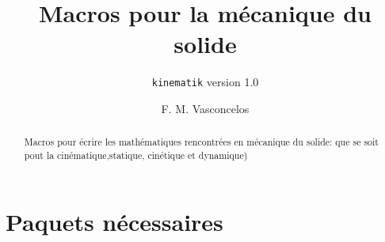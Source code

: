 \documentclass[a4paper,9pt]{article}
\title{Macros pour la mécanique du solide}
\subtitle{\texttt{kinematik} version 1.0}
\author{F. M. Vasconcelos}
\date{}
\begin{document}
\maketitle
\begin{abstract}
Macros pour écrire les mathématiques rencontrées en mécanique du solide:
que se soit pout la cinématique,statique, cinétique et dynamique) 
\end{abstract}

\section{Paquets nécessaires}                                                         
\end{document}
